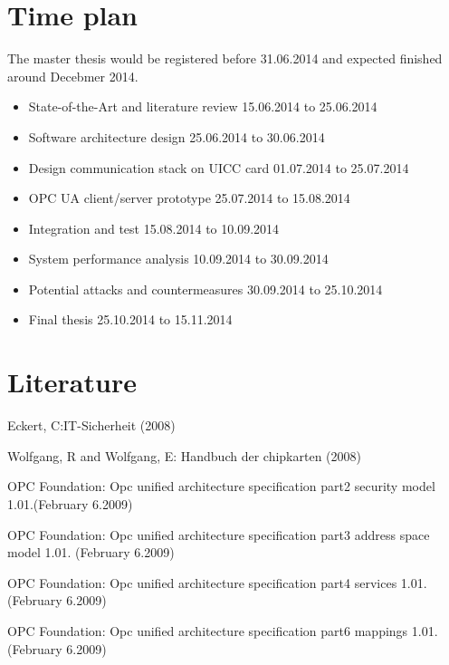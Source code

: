 \documentclass[]{llncs}
\begin{document}
\section{Time plan}
The master thesis would be registered before 31.06.2014 and expected finished around Decebmer 2014.
\begin{itemize}
\item State-of-the-Art and literature review		\hfill 15.06.2014 to 25.06.2014
\item Software architecture design \hfill 25.06.2014 to 30.06.2014
\item Design communication stack on UICC card 		 \hfill 01.07.2014 to 25.07.2014
\item OPC UA client/server prototype 		\hfill 25.07.2014 to 15.08.2014
\item Integration and test		\hfill 15.08.2014 to 10.09.2014
\item System performance analysis \hfill 10.09.2014 to 30.09.2014
\item Potential attacks and countermeasures \hfill 30.09.2014 to 25.10.2014
\item Final thesis \hfill 25.10.2014 to 15.11.2014
\end{itemize}

\section{Literature}
Eckert, C:IT-Sicherheit (2008)

Wolfgang, R and Wolfgang, E: Handbuch der chipkarten (2008)

OPC Foundation: Opc unified architecture specification part2 security model 1.01.(February 6.2009)

OPC Foundation: Opc unified architecture specification part3 address space model 1.01. (February 6.2009)

OPC Foundation: Opc unified architecture specification part4 services 1.01.(February 6.2009)

OPC Foundation: Opc unified architecture specification part6 mappings 1.01.(February 6.2009)
\end{document}
